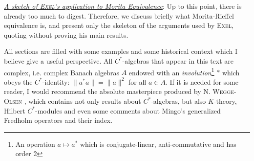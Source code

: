 \begin{itroman}
	\item \underline{\textit{A sketch of \textsc{Exel}'s application to Morita Equivalence}}: Up to this point, there is already too much to digest. Therefore, we discuss briefly what Morita-Rieffel equivalence is, and present only the skeleton of the arguments used by \textsc{Exel}, quoting without proving his main results.      
\end{itroman}
\thispagestyle{empty}
All sections are filled with some examples and some historical context which I believe give a useful perspective. All $C^*$-algebras that appear in this text are complex, i.e. complex Banach algebras $A$ endowed with an \textit{involution}\footnote{An operation $a \longmapsto a^*$ which is conjugate-linear, anti-commutative and has order 2} $*$ which obeys the $C^*$-identity: $\|a^*a\|=\|a\|^2$ for all $a\in A$. If it is needed for some reader, I would recommend the absolute masterpiece produced by \textsc{N. Wegge-Olsen} \cite{wegge1993k}, which contains not only results about $C^*$-algebras, but also $K$-theory, Hilbert $C^*$-modules and even some comments about Mingo's generalized Fredholm operators and their index. 


\thispagestyle{empty}